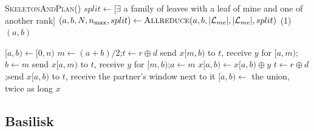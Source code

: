 \begin{algorithm}[H]
  \caption{The end of  on a distributed tree: when
    to repartition (section~\ref{sec:when})}
  \label{alg:when}
  \begin{algorithmic}[1]
    \State \textsc{SkeletonAndPlan}() 
    \State $split \gets [\exists$ a family of leaves with a leaf of mine and
      one of another rank$]$
    \State $(a, b, N, n_{\max}, split) \gets \textsc{Allreduce}(a, b,
      |\mathcal{L}_{me}|, |\mathcal{L}_{me}|, split)$ 
      \State {}(1) 
    \EndIf
    \State \Return $(a, b)$ 
  \end{algorithmic}
\end{algorithm}

\begin{algorithm}[H]
  \caption{Rabenseifner's allreduce \cite{rabenseifner, thakur}, $p =
    2^k$ ranks, a vector $x$ of $n$ bytes}
  \label{alg:rabenseifner}
  \begin{algorithmic}[1]
    \State $[a, b) \gets [0, n)$ 
     
      \State $m \gets (a + b)/2$;\quad $t \gets r \oplus d$
        \State send $x[m, b)$ to $t$, receive $y$ for $[a, m)$;\quad $b
          \gets m$
      \Else
        \State send $x[a, m)$ to $t$, receive $y$ for $[m, b)$;\quad $a
          \gets m$
      \EndIf
      \State $x[a, b) \gets x[a, b) \oplus y$ 
    \EndFor
    \Statex \Comment{$x[a, b)$ is block $r$, reduced over all $p$ ranks}
     
      \State $t \gets r \oplus d$;\quad send $x[a, b)$ to $t$, receive the
        partner's window next to it
      \State $[a, b) \gets$ the union, twice as long
    \EndFor
    \State \Return $x$ 
  \end{algorithmic}
\end{algorithm}

\subsection{Basilisk}

